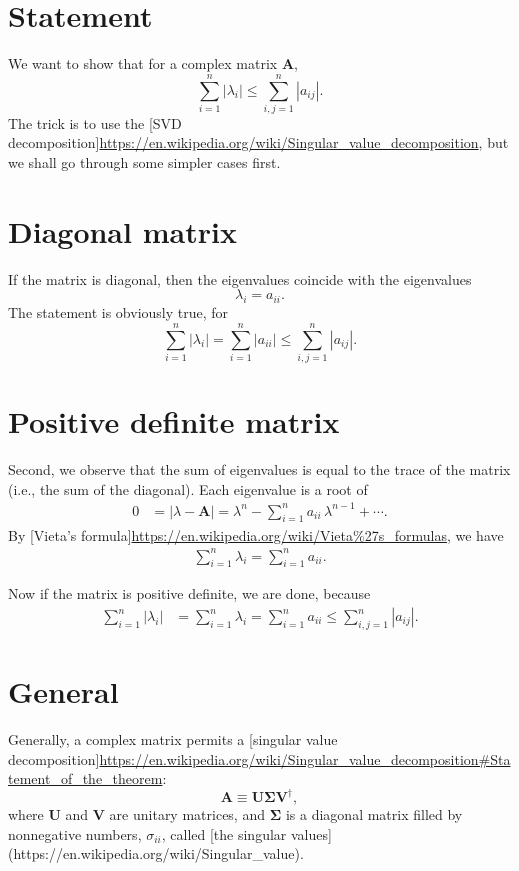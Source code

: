 \documentclass{article}
\begin{document}
\section{ Statement }

We want to show that for a complex matrix $\mathbf A$,
\begin{equation}
\sum_{i = 1}^n |\lambda_i| \le \sum_{i, j = 1}^n |a_{ij}|.
\end{equation}
The trick is to use the [SVD decomposition]\url{https://en.wikipedia.org/wiki/Singular_value_decomposition}, but we shall go through some simpler cases first.

\section{ Diagonal matrix }

If the matrix is diagonal, then the eigenvalues coincide with the eigenvalues
$$
\lambda_i = a_{ii}.
$$
The statement is obviously true, for
$$
\sum_{i=1}^n |\lambda_{i}| =
\sum_{i=1}^n |a_{ii}| \le \sum_{i,j=1}^n |a_{ij}|.
$$

\section{ Positive definite matrix }

Second, we observe that the sum of eigenvalues
is equal to the trace of the matrix (i.e., the sum of the diagonal).
Each eigenvalue is a root of
\begin{align}
0
&=
|\lambda - \mathbf A|
=
\lambda^n - \sum_{i = 1}^n a_{ii} \, \lambda^{n-1} + \cdots.
\end{align}
By [Vieta's formula]\url{https://en.wikipedia.org/wiki/Vieta\%27s_formulas},
we have
\begin{align}
  \sum_{i=1}^n \lambda_i = \sum_{i = 1}^n a_{ii}.
\end{align}

Now if the matrix is positive definite, we are done, because
\begin{align}
  \sum_{i = 1}^n |\lambda_i|
&=
  \sum_{i = 1}^n \lambda_i
=
\sum_{i = 1}^n a_{ii}
\le
\sum_{i,j=1}^n |a_{ij}|.
\end{align}


\section{ General }


Generally, a complex matrix permits a [singular value decomposition]\url{https://en.wikipedia.org/wiki/Singular\_value\_decomposition#Statement\_of\_the\_theorem}:
$$
\mathbf A \equiv \mathbf U \mathbf \Sigma \mathbf V^\dagger,
$$
where $\mathbf U$ and $\mathbf V$ are unitary matrices,
and $\mathbf \Sigma$ is a diagonal matrix
filled by nonnegative numbers, $\sigma_{ii}$, called [the singular values](https://en.wikipedia.org/wiki/Singular\_value).
\end{document}
